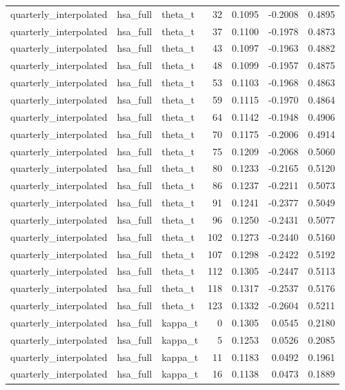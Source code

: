 \begin{tabular}{lllrrrr}
quarterly\_interpolated & hsa\_full & theta\_t & 32 & 0.1095 & -0.2008 & 0.4895 \\
quarterly\_interpolated & hsa\_full & theta\_t & 37 & 0.1100 & -0.1978 & 0.4873 \\
quarterly\_interpolated & hsa\_full & theta\_t & 43 & 0.1097 & -0.1963 & 0.4882 \\
quarterly\_interpolated & hsa\_full & theta\_t & 48 & 0.1099 & -0.1957 & 0.4875 \\
quarterly\_interpolated & hsa\_full & theta\_t & 53 & 0.1103 & -0.1968 & 0.4863 \\
quarterly\_interpolated & hsa\_full & theta\_t & 59 & 0.1115 & -0.1970 & 0.4864 \\
quarterly\_interpolated & hsa\_full & theta\_t & 64 & 0.1142 & -0.1948 & 0.4906 \\
quarterly\_interpolated & hsa\_full & theta\_t & 70 & 0.1175 & -0.2006 & 0.4914 \\
quarterly\_interpolated & hsa\_full & theta\_t & 75 & 0.1209 & -0.2068 & 0.5060 \\
quarterly\_interpolated & hsa\_full & theta\_t & 80 & 0.1233 & -0.2165 & 0.5120 \\
quarterly\_interpolated & hsa\_full & theta\_t & 86 & 0.1237 & -0.2211 & 0.5073 \\
quarterly\_interpolated & hsa\_full & theta\_t & 91 & 0.1241 & -0.2377 & 0.5049 \\
quarterly\_interpolated & hsa\_full & theta\_t & 96 & 0.1250 & -0.2431 & 0.5077 \\
quarterly\_interpolated & hsa\_full & theta\_t & 102 & 0.1273 & -0.2440 & 0.5160 \\
quarterly\_interpolated & hsa\_full & theta\_t & 107 & 0.1298 & -0.2422 & 0.5192 \\
quarterly\_interpolated & hsa\_full & theta\_t & 112 & 0.1305 & -0.2447 & 0.5113 \\
quarterly\_interpolated & hsa\_full & theta\_t & 118 & 0.1317 & -0.2537 & 0.5176 \\
quarterly\_interpolated & hsa\_full & theta\_t & 123 & 0.1332 & -0.2604 & 0.5211 \\
quarterly\_interpolated & hsa\_full & kappa\_t & 0 & 0.1305 & 0.0545 & 0.2180 \\
quarterly\_interpolated & hsa\_full & kappa\_t & 5 & 0.1253 & 0.0526 & 0.2085 \\
quarterly\_interpolated & hsa\_full & kappa\_t & 11 & 0.1183 & 0.0492 & 0.1961 \\
quarterly\_interpolated & hsa\_full & kappa\_t & 16 & 0.1138 & 0.0473 & 0.1889 \\

\end{tabular}
